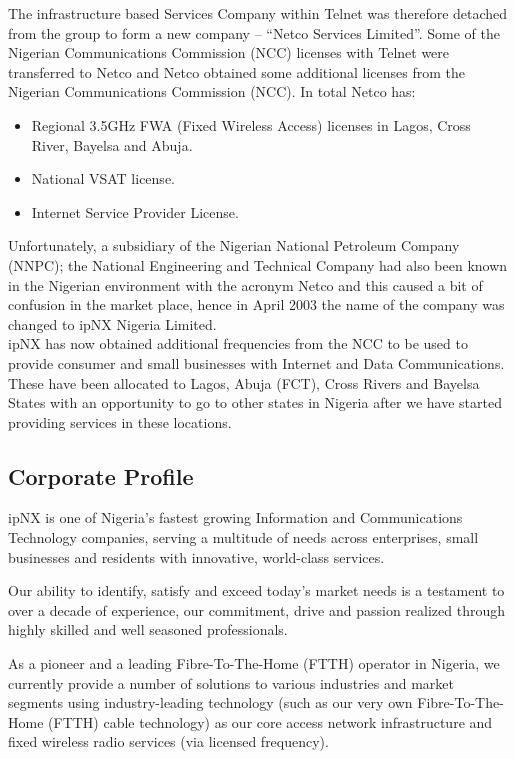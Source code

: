 The infrastructure based Services Company within Telnet was therefore detached from the group to form a new company – “Netco Services Limited”. Some of the Nigerian Communications Commission (NCC) licenses with Telnet were transferred to Netco and
Netco obtained some additional licenses from the Nigerian Communications Commission (NCC). In total Netco has:

\begin{itemize}	
	\item Regional 3.5GHz FWA (Fixed Wireless Access) licenses in Lagos, Cross River, Bayelsa
	and Abuja.

	\item National VSAT license.
	\item Internet Service Provider License.
\end{itemize}

Unfortunately, a subsidiary of the Nigerian National Petroleum Company (NNPC); the National Engineering and Technical Company had also been known in the Nigerian environment with the acronym Netco and this caused a bit of confusion in the market
place, hence in April 2003 the name of the company was changed to ipNX Nigeria Limited.\\

ipNX has now obtained additional frequencies from the NCC to be used to provide consumer and small businesses with Internet and Data Communications. These have been allocated to Lagos, Abuja (FCT), Cross Rivers and Bayelsa States with an opportunity to go to other states in Nigeria after we have started providing services in these locations.
\subsection{Corporate Profile}
ipNX is one of Nigeria’s fastest growing Information and Communications Technology companies, serving a multitude of needs across enterprises, small businesses and residents with innovative, world-class services.

Our ability to identify, satisfy and exceed today’s market needs is a testament to over a decade of experience, our commitment, drive and passion realized through highly skilled and well seasoned professionals.

As a pioneer and a leading Fibre-To-The-Home (FTTH) operator in Nigeria, we currently provide a number of solutions to various industries and market segments using industry-leading technology (such as our very own Fibre-To-The-Home (FTTH) cable technology) as our core access network infrastructure and fixed wireless radio services (via licensed frequency).


